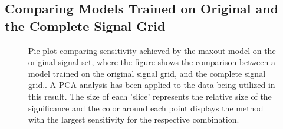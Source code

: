\subsection{Comparing Models Trained on Original and the Complete Signal Grid}\label{appendix:BigVsSmall}
\begin{figure}[H]
    \caption[Pie-plot comparing sensitivity achieved by the maxout model on the original signal set, where the figure shows the comparison between a model trained 
    on the original signal grid, and the complete signal grid.]{Pie-plot comparing sensitivity achieved by the maxout model on the original signal set, where the figure 
    shows the comparison between a model trained on the original signal grid, and the complete signal grid.. A \ac{PCA} analysis has been applied to the data being utilized 
    in this result. The size of each 'slice' represents the relative size of the significance and the color around each 
    point displays the method with the largest sensitivity for the respective combination.}
    \label{fig:BigVsLittleSetMaxOut}
\end{figure}
